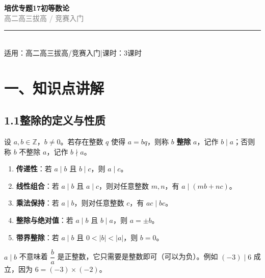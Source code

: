 \documentclass[12pt, a4paper]{ctexart}
\begin{document}
\begin{center}
{\Huge\bfseries\textcolor{mainblue}{培优专题17\quad 初等数论}}\\[12pt]
{\Large\textcolor{gray}{高二高三拔高 / 竞赛入门}}\\[8pt]
\rule{0.6\textwidth}{1pt}\\[8pt]
{\normalsize 适用：高二高三拔高/竞赛入门\quad |\quad 课时：3课时}
\end{center}
\vspace{10pt}

\section*{\textcolor{mainblue}{一、知识点讲解}}

\subsection*{1.1\quad 整除的定义与性质}

\begin{knowledgebox}[整除的定义]
设 $a, b \in \mathbb{Z}$，$b \neq 0$。若存在整数 $q$ 使得 $a = bq$，则称 $b$ \textbf{整除} $a$，记作 $b \mid a$；否则称 $b$ 不整除 $a$，记作 $b \nmid a$。
\end{knowledgebox}

\begin{knowledgebox}[整除的基本性质]
\begin{enumerate}[label=(\arabic*)]
  \item \textbf{传递性}：若 $a \mid b$ 且 $b \mid c$，则 $a \mid c$。
  \item \textbf{线性组合}：若 $a \mid b$ 且 $a \mid c$，则对任意整数 $m, n$，有 $a \mid (mb + nc)$。
  \item \textbf{乘法保持}：若 $a \mid b$，则对任意整数 $c$，有 $ac \mid bc$。
  \item \textbf{整除与绝对值}：若 $a \mid b$ 且 $b \mid a$，则 $a = \pm b$。
  \item \textbf{带界整除}：若 $a \mid b$ 且 $0 < |b| < |a|$，则 $b = 0$。
\end{enumerate}
\end{knowledgebox}

\begin{warnbox}[易错提醒]
$a \mid b$ 不意味着 $\dfrac{b}{a}$ 是正整数，它只需要是整数即可（可以为负）。例如 $(-3) \mid 6$ 成立，因为 $6 = (-3) \times (-2)$。
\end{warnbox}
\end{document}

